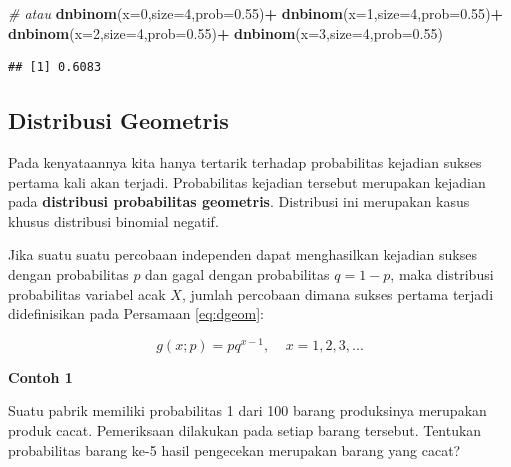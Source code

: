 \documentclass[]{book}
\newenvironment{Shaded}{\begin{snugshade}}{\end{snugshade}}
\newcommand{\KeywordTok}[1]{\textcolor[rgb]{0.13,0.29,0.53}{\textbf{#1}}}
\newcommand{\DataTypeTok}[1]{\textcolor[rgb]{0.13,0.29,0.53}{#1}}
\newcommand{\DecValTok}[1]{\textcolor[rgb]{0.00,0.00,0.81}{#1}}
\newcommand{\FloatTok}[1]{\textcolor[rgb]{0.00,0.00,0.81}{#1}}
\newcommand{\StringTok}[1]{\textcolor[rgb]{0.31,0.60,0.02}{#1}}
\newcommand{\CommentTok}[1]{\textcolor[rgb]{0.56,0.35,0.01}{\textit{#1}}}
\newcommand{\OperatorTok}[1]{\textcolor[rgb]{0.81,0.36,0.00}{\textbf{#1}}}
\newcommand{\NormalTok}[1]{#1}
\begin{document}
\begin{Shaded}
\begin{Highlighting}[]
\CommentTok{# atau}
\KeywordTok{dnbinom}\NormalTok{(}\DataTypeTok{x=}\DecValTok{0}\NormalTok{,}\DataTypeTok{size=}\DecValTok{4}\NormalTok{,}\DataTypeTok{prob=}\FloatTok{0.55}\NormalTok{)}\OperatorTok{+}
\StringTok{  }\KeywordTok{dnbinom}\NormalTok{(}\DataTypeTok{x=}\DecValTok{1}\NormalTok{,}\DataTypeTok{size=}\DecValTok{4}\NormalTok{,}\DataTypeTok{prob=}\FloatTok{0.55}\NormalTok{)}\OperatorTok{+}
\StringTok{  }\KeywordTok{dnbinom}\NormalTok{(}\DataTypeTok{x=}\DecValTok{2}\NormalTok{,}\DataTypeTok{size=}\DecValTok{4}\NormalTok{,}\DataTypeTok{prob=}\FloatTok{0.55}\NormalTok{)}\OperatorTok{+}
\StringTok{  }\KeywordTok{dnbinom}\NormalTok{(}\DataTypeTok{x=}\DecValTok{3}\NormalTok{,}\DataTypeTok{size=}\DecValTok{4}\NormalTok{,}\DataTypeTok{prob=}\FloatTok{0.55}\NormalTok{)}
\end{Highlighting}
\end{Shaded}

\begin{verbatim}
## [1] 0.6083
\end{verbatim}

\subsection{Distribusi Geometris}\label{distribusi-geometris}

Pada kenyataannya kita hanya tertarik terhadap probabilitas kejadian
sukses pertama kali akan terjadi. Probabilitas kejadian tersebut
merupakan kejadian pada \textbf{distribusi probabilitas geometris}.
Distribusi ini merupakan kasus khusus distribusi binomial negatif.

Jika suatu suatu percobaan independen dapat menghasilkan kejadian sukses
dengan probabilitas \(p\) dan gagal dengan probabilitas \(q=1-p\), maka
distribusi probabilitas variabel acak \(X\), jumlah percobaan dimana
sukses pertama terjadi didefinisikan pada Persamaan \eqref{eq:dgeom}:

\begin{equation}
   g\left(x;p\right)=pq^{x-1},\ \ \ \ \ x=1,2,3,...
  \label{eq:dgeom}
\end{equation}

\textbf{Contoh 1}

Suatu pabrik memiliki probabilitas 1 dari 100 barang produksinya
merupakan produk cacat. Pemeriksaan dilakukan pada setiap barang
tersebut. Tentukan probabilitas barang ke-5 hasil pengecekan merupakan
barang yang cacat?
\end{document}
